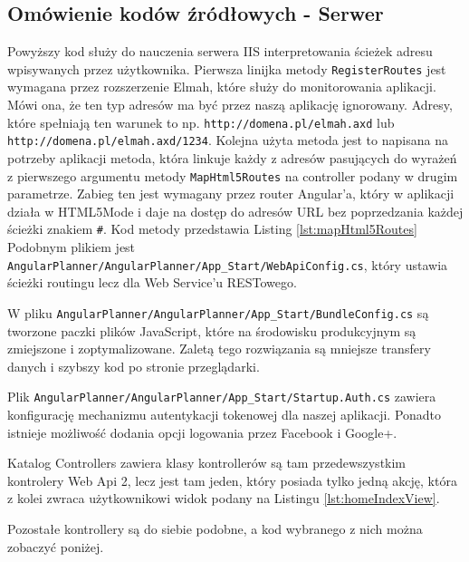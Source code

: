 \documentclass[10pt,titlepage]{article}
\begin{document}
\subsection{Omówienie kodów źródłowych - Serwer}
\lstset{style=sharpc}

\par Powyższy kod służy do nauczenia serwera IIS interpretowania ścieżek adresu wpisywanych przez użytkownika. Pierwsza linijka metody \verb|RegisterRoutes| jest wymagana przez rozszerzenie Elmah, które służy do monitorowania aplikacji. Mówi ona, że ten typ adresów ma być przez naszą aplikację ignorowany. Adresy, które spełniają ten warunek to np. \verb|http://domena.pl/elmah.axd| lub \verb|http://domena.pl/elmah.axd/1234|. Kolejna użyta metoda jest to napisana na potrzeby aplikacji metoda, która linkuje każdy z adresów pasujących do wyrażeń z pierwszego argumentu metody \verb|MapHtml5Routes| na controller podany w drugim parametrze. Zabieg ten jest wymagany przez router Angular'a, który w aplikacji działa w HTML5Mode i daje na dostęp do adresów URL bez poprzedzania każdej ścieżki znakiem \verb|#|. Kod metody przedstawia Listing \ref{lst:mapHtml5Routes} Podobnym plikiem jest \verb|AngularPlanner/AngularPlanner/App_Start/WebApiConfig.cs|, który ustawia ścieżki routingu lecz dla Web Service'u RESTowego.

\par W pliku \verb|AngularPlanner/AngularPlanner/App_Start/BundleConfig.cs| są tworzone paczki plików JavaScript, które na środowisku produkcyjnym są zmiejszone i zoptymalizowane. Zaletą tego rozwiązania są mniejsze transfery danych i szybszy kod po stronie przeglądarki.\par Plik \verb|AngularPlanner/AngularPlanner/App_Start/Startup.Auth.cs| zawiera konfigurację mechanizmu autentykacji tokenowej dla naszej aplikacji. Ponadto istnieje możliwość dodania opcji logowania przez Facebook i Google+.\par Katalog Controllers zawiera klasy kontrollerów są tam przedewszystkim kontrolery Web Api 2, lecz jest tam jeden, który posiada tylko jedną akcję, która z kolei zwraca użytkownikowi widok podany na Listingu \ref{lst:homeIndexView}.

\par Pozostałe kontrollery są do siebie podobne, a kod wybranego z nich można zobaczyć poniżej.
\end{document}
